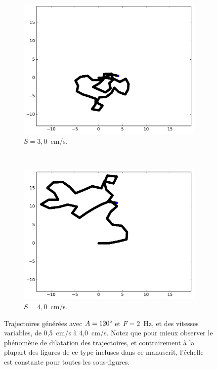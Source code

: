 \begin{figure}[htb]
		~
		\begin{subfigure}[t]{\subImgWarea}
			\centering
			\includegraphics[width=\textwidth]{figures/ch3/spTraj_3_0_120_2}
			\caption[$S = 3,0$]{$S = 3,0$~cm/s.}
			\label{fig:spTraj_3_0_120_2}
		\end{subfigure}
		~
		\begin{subfigure}[t]{\subImgWarea}
			\centering
			\includegraphics[width=\textwidth]{figures/ch3/spTraj_4_0_120_2}
			\caption[$S = 4,0$]{$S = 4,0$~cm/s.}
			\label{fig:spTraj_4_0_120_2}
		\end{subfigure}
		\caption[Effet des vitesses]{Trajectoires générées avec $A = 120\degree$ et $F = 2$~Hz, et des vitesses variables, de 0,5~cm/s à 4,0~cm/s. Notez que pour mieux observer le phénomène de \og dilatation \fg{} des trajectoires, et contrairement à la plupart des figures de ce type incluses dans ce manuscrit, l'échelle est constante pour toutes les sous-figures.}
		\label{fig:spEffect}
	\end{figure}
	
